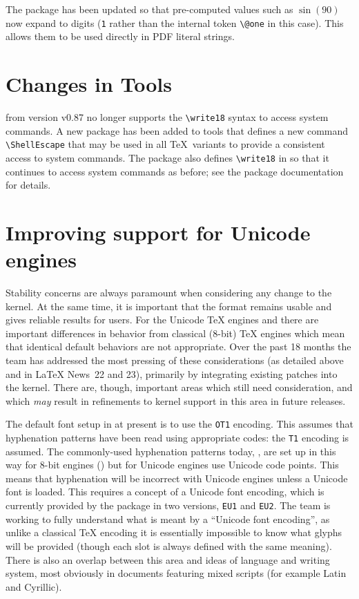 \documentclass{ltnews}
\begin{document}
The  package has been updated so that pre-computed values
such as $\sin(90)$ now expand to digits (\texttt{1} rather than the
internal token \verb|\@one| in this case). This allows them to be used
directly in PDF literal strings. 

\section{Changes in Tools}

 from version v0.87 no longer supports the
\verb|\write18| syntax to access system commands. A new package
 has been added to \textsf{tools} that defines a new
command \verb|\ShellEscape| that may be used in all \TeX\ variants to
provide a consistent access to system commands. The package also
defines \verb|\write18| in   so that it continues to access
system commands as before; see the package documentation for details.

\section{Improving support for Unicode engines}

Stability concerns are always paramount when considering any change to
the \LaTeXe{} kernel. At the same time, it is important that the format
remains usable and gives reliable results for users. For the Unicode
\TeX{} engines  and  there are important
differences in behavior from classical ($8$-bit) \TeX{} engines which
mean that identical default behaviors are not appropriate. Over the
past 18 months the team has addressed the most pressing of these
considerations (as detailed above and in \LaTeX{} News~22 and 23),
primarily by integrating existing patches into the kernel. There are,
though, important areas which still need consideration, and which
\emph{may} result in refinements to kernel support in this area in
future releases.

The default font setup in \LaTeXe{} at present is to use the \texttt{OT1}
encoding. This assumes that hyphenation patterns have been read using
appropriate codes: the \texttt{T1} encoding is assumed. The commonly-used
hyphenation patterns today, , are set up in this
way for $8$-bit engines () but for Unicode engines use
Unicode code points. This means that hyphenation will be incorrect
with Unicode engines unless a Unicode font is loaded. This requires
a concept of a Unicode font encoding, which is currently provided by
the  package in two versions, \texttt{EU1} and
\texttt{EU2}. The team is working to fully understand what is meant
by a ``Unicode font encoding'', as unlike a classical \TeX{} encoding
it is essentially impossible to know what glyphs will be provided
(though each slot is always defined with the same meaning).  There
is also an overlap between this area and ideas of language and writing
system, most obviously in documents featuring mixed scripts (for example
Latin and Cyrillic).
\end{document}

